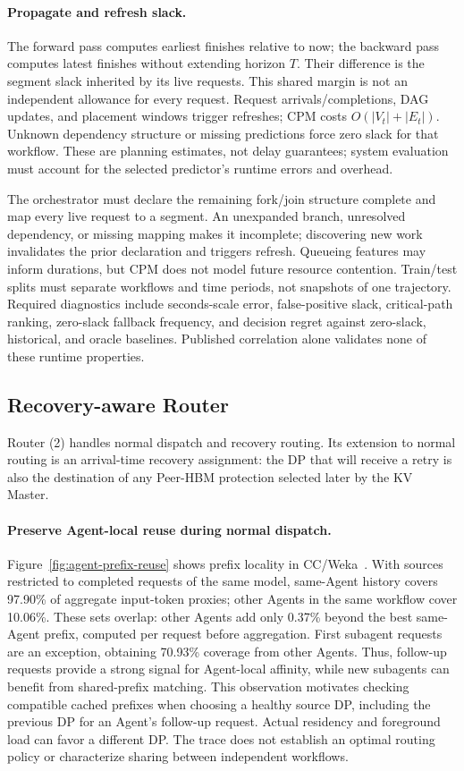 \paragraph{Propagate and refresh slack.}
The forward pass computes earliest finishes relative to now; the
backward pass computes latest finishes without extending horizon $T$.
Their difference is the segment slack inherited by its live requests.
This shared margin is not an independent allowance for every request.
Request arrivals/completions, DAG updates, and placement windows trigger
refreshes; CPM costs $O(|V_t|+|E_t|)$. Unknown dependency structure or missing
predictions force zero slack for that workflow. These are planning
estimates, not delay guarantees; system evaluation must account for
the selected predictor's runtime errors and overhead.

The orchestrator must declare the remaining fork/join structure complete
and map every live request to a segment. An unexpanded branch, unresolved
dependency, or missing mapping makes it incomplete; discovering new work
invalidates the prior declaration and triggers refresh. Queueing features
may inform durations, but CPM does not model future resource contention.
Train/test splits must separate workflows and time periods, not snapshots
of one trajectory. Required diagnostics include seconds-scale error,
false-positive slack, critical-path ranking, zero-slack fallback frequency,
and decision regret against zero-slack, historical, and oracle baselines.
Published correlation alone validates none of these runtime properties.
\subsection{Recovery-aware Router}
\label{sec:parallel-recovery}
\label{sec:recovery-router}

Router (2) handles normal dispatch and recovery routing.
Its extension to normal routing is an arrival-time recovery assignment:
the DP that will receive a retry is also the destination of any
Peer-HBM protection selected later by the KV Master.

\paragraph{Preserve Agent-local reuse during normal dispatch.}
Figure~\ref{fig:agent-prefix-reuse} shows prefix locality in
CC/Weka~\cite{semianalysis2026cctraces}. With sources restricted
to completed requests of the same model, same-Agent history covers
97.90\% of aggregate input-token proxies; other Agents in the same workflow
cover 10.06\%. These sets overlap: other Agents add only 0.37\% beyond
the best same-Agent prefix, computed per request before aggregation.
First subagent requests are an exception, obtaining 70.93\% coverage
from other Agents. Thus, follow-up requests provide a strong signal for
Agent-local affinity, while new subagents can benefit from shared-prefix
matching. This observation motivates checking compatible cached prefixes
when choosing a healthy source DP, including the previous DP for an Agent's
follow-up request. Actual residency and foreground load can favor a
different DP. The trace does not establish an optimal routing policy or
characterize sharing between independent workflows.

